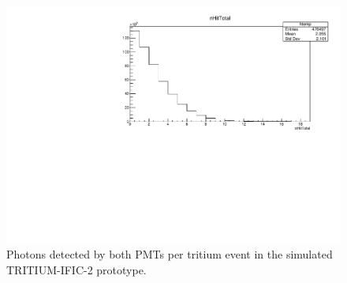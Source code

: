 \begin{figure}[hbtp]
\centering
\includegraphics[scale=0.65]{Figures/8SimulationsResults/82TRITIUMMonitor/821TRITIUMIFIC2/PhotonsDetected_simulation.pdf}
\caption{Photons detected by both PMTs per tritium event in the simulated TRITIUM-IFIC-2 prototype.\label{fig:SimulatedPhotonsDetected}}
\end{figure}

